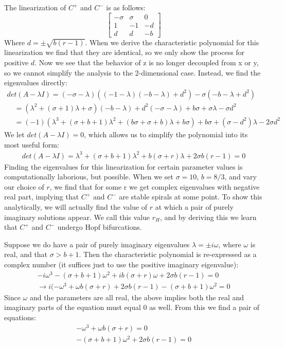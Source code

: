 \documentclass{report}
\begin{document}
The linearization of \(C^+\) and \(C^-\) is as follows:
\[
\begin{bmatrix}
   -\sigma & \sigma & 0 \\
   1 & -1 & -d \\
   d & d & -b
\end{bmatrix}
\]
Where \(d = \pm \sqrt{b(r-1)}\). When we derive the characteristic polynomial 
for this linearization we find that they are identical, so we only show the
process for positive \(d\). Now we see that the behavior of z is no longer
decoupled from x or y, so we cannot simplify the analysis to the 2-dimensional
case. Instead, we find the eigenvalues directly:
\begin{align*}
  det(A-\lambda I) = (-\sigma-\lambda)((-1-\lambda)(-b-\lambda)+d^2 )-
  \sigma(-b-\lambda+d^2) \\
  \quad = (\lambda^2 +(\sigma+1)\lambda+\sigma)(-b-\lambda)+
d^2(-\sigma-\lambda)+b\sigma+\sigma\lambda-\sigma d^2 \\
  \quad = (-1)(\lambda^3 +(\sigma + b + 1)\lambda^2 +(b\sigma+\sigma+b)\lambda
+b\sigma)+b\sigma+(\sigma-d^2)\lambda-2\sigma d^2
\end{align*}
We let \(det(A-\lambda I) = 0\), which allows us to simplify the polynomial
into its most useful form:
\begin{align*}
  det(A-\lambda I) = \lambda^3 + (\sigma+b+1)\lambda^2 + b(\sigma+r)\lambda
+ 2\sigma b(r-1) = 0
\end{align*}
Finding the eigenvalues for this linearization for certain parameter values
is computationally laborious, but possible. When we set \(\sigma = 10\),
\(b=8/3\), and vary our choice of \(r\), we find that for some r we get
complex eigenvalues with negative real part, implying that \(C^+\) and \(C^-\)
are stable spirals at some point. To show this analytically, we will actually
find the value of \(r\) at which a pair of purely imaginary solutions appear.
We call this value \(r_H\), and by deriving this we learn that \(C^+\) and
\(C^-\) undergo Hopf bifurcations. 

Suppose we do have a pair of purely imaginary eigenvalues \(\lambda = \pm
i\omega\), where \(\omega\) is real, and that \( \sigma > b+1 \). Then the
characteristic polynomial is re-expressed as a complex number (it suffices
just to use the positive imaginary eigenvalue):
\begin{align*}
   -i\omega^3 - (\sigma + b + 1)\omega^2 + ib(\sigma + r)\omega
+ 2\sigma b(r-1) = 0 \\
   \rightarrow i(-\omega^3 +\omega b(\sigma + r) + 2\sigma b(r-1) -
(\sigma+b+1)\omega^2 = 0
\end{align*}
Since \(\omega\) and the parameters are all real, the above implies both
the real and imaginary parts of the equation must equal 0 as well. From this
we find a pair of equations:
\begin{align}
   -\omega^3 +\omega b(\sigma+r) = 0 \\
   -(\sigma +b+1)\omega^2 + 2\sigma b(r-1) = 0
\end{align}
\end{document}
